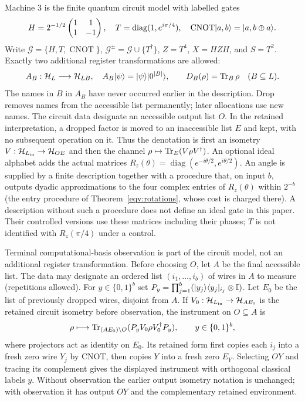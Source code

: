 \begin{definition}\label{def:circuit}
Machine 3 is the finite quantum circuit model with labelled gates
\[
 H=2^{-1/2}\begin{pmatrix}1&1\\1&-1\end{pmatrix},\quad
 T=\operatorname{diag}(1,e^{i\pi/4}),\quad
 \operatorname{CNOT}\lvert a,b\rangle=\lvert a,b\oplus a\rangle.
\]
Write $\mathcal G=\{H,T,\operatorname{CNOT}\}$,
$\mathcal G^{\pm}=\mathcal G\cup\{T^\dagger\}$,
$Z=T^4$, $X=HZH$, and $S=T^2$.
Exactly two additional register transformations are allowed:
\[
 A_B:\mathcal{H}_L\longrightarrow\mathcal{H}_{LB},\quad
 A_B\lvert \psi\rangle=\lvert \psi\rangle\lvert 0^{|B|}\rangle,\qquad
 D_B(\rho)=\operatorname{Tr}_B\rho\quad(B\subseteq L).
\]
The names in $B$ in $A_B$ have never occurred earlier in the description.
Drop removes names from the accessible list permanently; later allocations
use new names. The circuit data designate an accessible output list $O$.
In the retained interpretation, a dropped factor is moved to an inaccessible
list $E$ and kept, with no subsequent operation on it. Thus the denotation
is first an isometry $V:\mathcal{H}_{L_{\rm in}}\to\mathcal{H}_{OE}$ and then the channel
$\rho\mapsto\operatorname{Tr}_E(V\rho V^\dagger)$.
An optional ideal alphabet adds the actual matrices
$R_z(\theta)=\operatorname{diag}(e^{-i\theta/2},e^{i\theta/2})$.
An angle is supplied by a finite description together with a procedure
that, on input $b$, outputs dyadic approximations to the four complex
entries of $R_z(\theta)$ within $2^{-b}$ (the entry procedure of
Theorem~\ref{eqv:rotations}, whose cost is charged there). A description
without such a procedure does not define an ideal gate in this paper.
Their controlled versions use these matrices including their phases;
$T$ is not identified with $R_z(\pi/4)$ under a control.

Terminal computational-basis observation is part of the circuit model,
not an additional register transformation. Before choosing $O$, let $A$
be the final accessible list. The data may designate an ordered list
$(i_1,\ldots,i_b)$ of wires in $A$ to measure (repetitions allowed).
For $y\in\{0,1\}^b$ set
$P_y=\prod_{j=1}^b(\lvert y_j\rangle\langle y_j\rvert_{i_j}\otimes\mathbb{I})$.
Let $E_0$ be the list of previously dropped wires, disjoint from $A$.
If $V_0:\mathcal{H}_{L_{\rm in}}\to\mathcal{H}_{AE_0}$ is the retained circuit
isometry before observation, the
instrument on $O\subseteq A$ is
\[
 \rho\longmapsto\operatorname{Tr}_{(AE_0)\setminus O}
       (P_yV_0\rho V_0^\dagger P_y),\qquad y\in\{0,1\}^b,
\]
where projectors act as identity on $E_0$. Its retained form first
copies each $i_j$ into
a fresh zero wire $Y_j$ by CNOT, then copies $Y$ into a fresh zero
$E_Y$. Selecting $OY$ and tracing its complement gives the displayed
instrument with orthogonal classical labels $y$. Without observation
the earlier output isometry notation is unchanged; with observation
it has output $OY$ and the complementary retained environment.
\end{definition}

